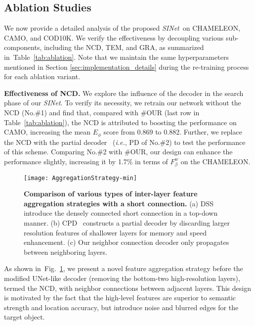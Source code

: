 \documentclass[10pt,journal,compsoc]{IEEEtran}
\def\ie{\emph{i.e.}}
\newcommand{\myPara}[1]{\vspace{6pt}\noindent\textbf{#1}\qquad }
\newcommand{\figref}[1]{Fig.~\ref{#1}}
\newcommand{\tabref}[1]{Table~\ref{#1}}
\newcommand{\secref}[1]{Section \ref{#1}}
\def\ournewmodel{\emph{SINet}}
\begin{document}
\subsection{Ablation Studies}\label{sec:ablation_study}

We now provide a detailed analysis of the proposed \ournewmodel~on 
CHAMELEON, CAMO, and COD10K. We verify the effectiveness 
by decoupling various sub-components, including the NCD, TEM, and GRA, 
as summarized in~\tabref{tab:ablation}.
%
Note that we maintain the same hyperparameters mentioned in
\secref{sec:implementation_details} during the re-training process 
for each ablation variant.



\myPara{Effectiveness of NCD.}
%
We explore the influence of the decoder in the search phase of our 
\ournewmodel. 
To verify its necessity, we retrain our network without the NCD (No.\#1) 
and find that, compared with \#OUR (last row in \tabref{tab:ablation}), 
the NCD is attributed to boosting the performance on CAMO, 
increasing the mean $E_\phi$ score from 0.869 to 0.882. 
%
Further, we replace the NCD with the partial decoder~\cite{wu2019cascaded} 
(\ie, PD of No.\#2) to test the performance of this scheme.
%
Comparing No.\#2 with \#OUR, our design can enhance the performance slightly, 
increasing it by 1.7\% in terms of $F^w_\beta$ on the CHAMELEON.


\begin{figure}[t!]
  \centering
  \texttt{[image: AggregationStrategy-min]}\\
  \vspace{-12pt}
  \caption{\textbf{Comparison of various types of inter-layer feature 
    aggregation strategies with a short connection.} 
    (a) DSS~\cite{HouPami19Dss} introduce the densely connected short 
    connection in a top-down manner. 
    (b) CPD~\cite{wu2019cascaded} constructs a partial decoder by discarding 
    larger resolution features of shallower layers for memory and speed 
    enhancement. 
    (c) Our neighbor connection decoder only propagates between neighboring
    layers. 
  }\label{fig:agg_strategy}
\end{figure}

As shown in~\figref{fig:agg_strategy}, we present a novel feature aggregation
strategy before the modified UNet-like decoder 
(removing the bottom-two high-resolution layers), termed the NCD, 
with neighbor connections between adjacent layers. 
This design is motivated by the fact that the high-level features are superior 
to semantic strength and location accuracy, 
but introduce noise and blurred edges for the target object.
\end{document}
